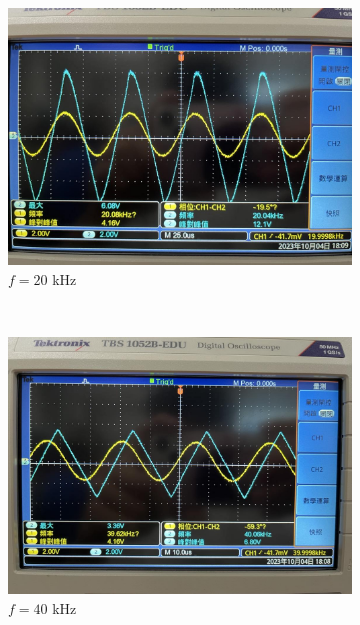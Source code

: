 \documentclass{article}
\begin{document}
\begin{CJK*}{UTF8}{bkai}
\begin{center}
\begin{figure}[h]
    \begin{subfigure}[b]{0.3\textwidth}
        \includegraphics[width=\textwidth]{noninv_20k.jpg}
        \caption{$f = 20$ \unit{\kilo\hertz}}
    \end{subfigure}
    ~
    \begin{subfigure}[b]{0.3\textwidth}
        \includegraphics[width=\textwidth]{noninv_40k.jpg}
        \caption{$f = 40$ \unit{\kilo\hertz}}
    \end{subfigure}
    ~
    \begin{subfigure}[b]{0.3\textwidth}

\end{subfigure}
\end{figure}
\end{center}
\end{CJK*}
\end{document}
